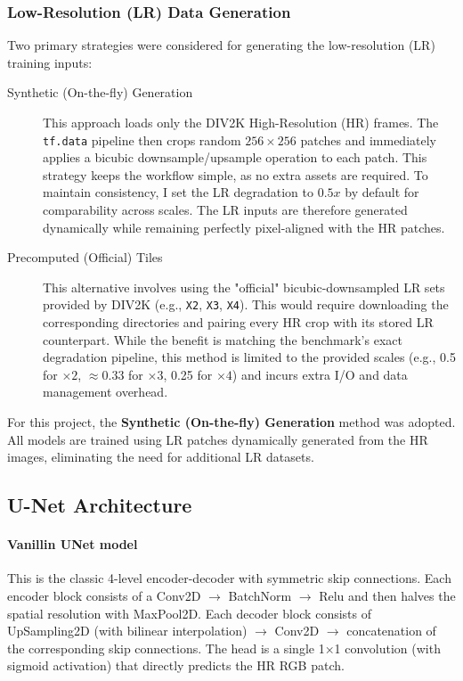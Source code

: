 \subsubsection{Low-Resolution (LR) Data Generation}
\label{subsubsec:lr_generation}

Two primary strategies were considered for generating the low-resolution (LR) training inputs:

\begin{description}
    \item[Synthetic (On-the-fly) Generation] 
    This approach loads only the DIV2K High-Resolution (HR) frames. The \texttt{tf.data} pipeline then crops random $256 \times 256$ patches and immediately applies a bicubic downsample/upsample operation to each patch. This strategy keeps the workflow simple, as no extra assets are required. To maintain consistency, I set the LR degradation to $0.5x$ by default for comparability across scales. The LR inputs are therefore generated dynamically while remaining perfectly pixel-aligned with the HR patches.

    \item[Precomputed (Official) Tiles] 
    This alternative involves using the "official" bicubic-downsampled LR sets provided by DIV2K (e.g., \texttt{X2}, \texttt{X3}, \texttt{X4}). This would require downloading the corresponding directories and pairing every HR crop with its stored LR counterpart. While the benefit is matching the benchmark's exact degradation pipeline, this method is limited to the provided scales (e.g., 0.5 for $\times 2$, $\approx 0.33$ for $\times 3$, 0.25 for $\times 4$) and incurs extra I/O and data management overhead.
\end{description}

For this project, the \textbf{Synthetic (On-the-fly) Generation} method was adopted. All models are trained using LR patches dynamically generated from the HR images, eliminating the need for additional LR datasets.


\subsection{U-Net Architecture}
\label{subsec:architecture}

\paragraph{Vanillin UNet model}

This is the classic 4-level encoder-decoder with symmetric skip connections. Each encoder block consists of a Conv2D $\rightarrow$ BatchNorm $\rightarrow$ Relu and then halves the spatial resolution with MaxPool2D. Each decoder block consists of UpSampling2D (with bilinear interpolation) $\rightarrow$ Conv2D $\rightarrow$  concatenation of the corresponding skip connections. The head is a single 1×1  convolution (with sigmoid activation) that directly predicts the HR RGB patch. 

